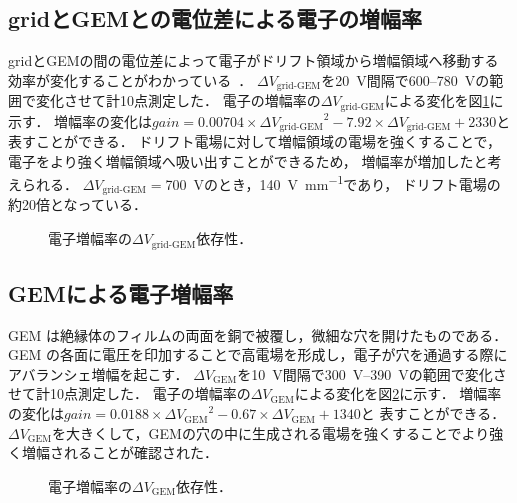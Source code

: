 \documentclass[../master]{subfiles}
\begin{document}
\subsection{gridとGEMとの電位差による電子の増幅率}
gridとGEMの間の電位差によって電子がドリフト領域から増幅領域へ移動する効率が変化することがわかっている~\cite{furuno}．
$\Delta V_{\text{grid-GEM}}$を\SI{20}{\volt}間隔で\SI{600}{}--\SI{780}{\volt}の範囲で変化させて計10点測定した．
電子の増幅率の$\Delta V_{\text{grid-GEM}}$による変化を図\ref{fig::gain_grid_GEM_V_dep}に示す．
増幅率の変化は$\mathit{gain} = 0.00704\times{\Delta V_{\text{grid-GEM}}}^2-7.92\times{\Delta V_{\text{grid-GEM}}}+2330$と
表すことができる．
ドリフト電場に対して増幅領域の電場を強くすることで，電子をより強く増幅領域へ吸い出すことができるため，
増幅率が増加したと考えられる．
$\Delta V_{\text{grid-GEM}} = $\SI{700}{\volt}のとき，\SI{140}{\volt\per\milli\metre}であり，
ドリフト電場の約20倍となっている．
\begin{figure}
  \centering
  \scalebox{0.7}{}
  \caption{電子増幅率の$\Delta V_{\text{grid-GEM}}$依存性．}
  \label{fig::gain_grid_GEM_V_dep}
\end{figure}

\subsection{GEMによる電子増幅率}
GEM は絶縁体のフィルムの両面を銅で被覆し，微細な穴を開けたものである．
GEM の各面に電圧を印加することで高電場を形成し，電子が穴を通過する際にアバランシェ増幅を起こす．
$\Delta V_{\text{GEM}}$を\SI{10}{\volt}間隔で\SIrange{300}{390}{\volt}の範囲で変化させて計10点測定した．
電子の増幅率の$\Delta V_{\text{GEM}}$による変化を図\ref{fig::gain_GEM_V_dep}に示す．
増幅率の変化は$\mathit{gain} = 0.0188\times{\Delta V_{\text{GEM}}}^2-0.67\times{\Delta V_{\text{GEM}}}+1340$と
表すことができる．
$\Delta V_{\text{GEM}}$を大きくして，GEMの穴の中に生成される電場を強くすることでより強く増幅されることが確認された．
\begin{figure}
  \centering
  \scalebox{0.7}{}
  \caption{電子増幅率の$\Delta V_{\text{GEM}}$依存性．}
  \label{fig::gain_GEM_V_dep}
\end{figure}
\end{document}
